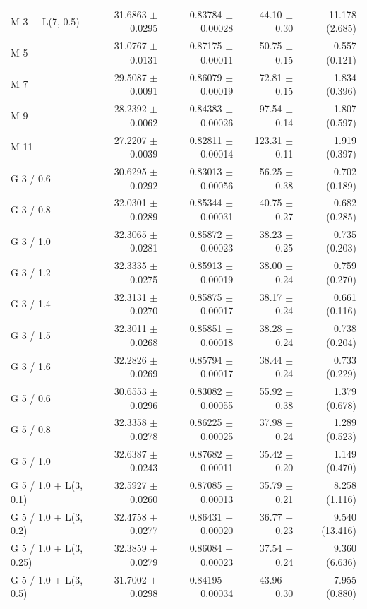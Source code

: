 \begin{longtable}{lrrrr}
M 3 + L(7, 0.5) & 31.6863 $\pm$ 0.0295 & 0.83784 $\pm$ 0.00028 & 44.10 $\pm$ 0.30 & 11.178 (2.685) \\
M 5 & 31.0767 $\pm$ 0.0131 & 0.87175 $\pm$ 0.00011 & 50.75 $\pm$ 0.15 & 0.557 (0.121) \\
M 7 & 29.5087 $\pm$ 0.0091 & 0.86079 $\pm$ 0.00019 & 72.81 $\pm$ 0.15 & 1.834 (0.396) \\
M 9 & 28.2392 $\pm$ 0.0062 & 0.84383 $\pm$ 0.00026 & 97.54 $\pm$ 0.14 & 1.807 (0.597) \\
M 11 & 27.2207 $\pm$ 0.0039 & 0.82811 $\pm$ 0.00014 & 123.31 $\pm$ 0.11 & 1.919 (0.397) \\
G 3 / 0.6 & 30.6295 $\pm$ 0.0292 & 0.83013 $\pm$ 0.00056 & 56.25 $\pm$ 0.38 & 0.702 (0.189) \\
G 3 / 0.8 & 32.0301 $\pm$ 0.0289 & 0.85344 $\pm$ 0.00031 & 40.75 $\pm$ 0.27 & 0.682 (0.285) \\
G 3 / 1.0 & 32.3065 $\pm$ 0.0281 & 0.85872 $\pm$ 0.00023 & 38.23 $\pm$ 0.25 & 0.735 (0.203) \\
G 3 / 1.2 & 32.3335 $\pm$ 0.0275 & 0.85913 $\pm$ 0.00019 & 38.00 $\pm$ 0.24 & 0.759 (0.270) \\
G 3 / 1.4 & 32.3131 $\pm$ 0.0270 & 0.85875 $\pm$ 0.00017 & 38.17 $\pm$ 0.24 & 0.661 (0.116) \\
G 3 / 1.5 & 32.3011 $\pm$ 0.0268 & 0.85851 $\pm$ 0.00018 & 38.28 $\pm$ 0.24 & 0.738 (0.204) \\
G 3 / 1.6 & 32.2826 $\pm$ 0.0269 & 0.85794 $\pm$ 0.00017 & 38.44 $\pm$ 0.24 & 0.733 (0.229) \\
G 5 / 0.6 & 30.6553 $\pm$ 0.0296 & 0.83082 $\pm$ 0.00055 & 55.92 $\pm$ 0.38 & 1.379 (0.678) \\
G 5 / 0.8 & 32.3358 $\pm$ 0.0278 & 0.86225 $\pm$ 0.00025 & 37.98 $\pm$ 0.24 & 1.289 (0.523) \\
G 5 / 1.0 & 32.6387 $\pm$ 0.0243 & 0.87682 $\pm$ 0.00011 & 35.42 $\pm$ 0.20 & 1.149 (0.470) \\
G 5 / 1.0 + L(3, 0.1) & 32.5927 $\pm$ 0.0260 & 0.87085 $\pm$ 0.00013 & 35.79 $\pm$ 0.21 & 8.258 (1.116) \\
G 5 / 1.0 + L(3, 0.2) & 32.4758 $\pm$ 0.0277 & 0.86431 $\pm$ 0.00020 & 36.77 $\pm$ 0.23 & 9.540 (13.416) \\
G 5 / 1.0 + L(3, 0.25) & 32.3859 $\pm$ 0.0279 & 0.86084 $\pm$ 0.00023 & 37.54 $\pm$ 0.24 & 9.360 (6.636) \\
G 5 / 1.0 + L(3, 0.5) & 31.7002 $\pm$ 0.0298 & 0.84195 $\pm$ 0.00034 & 43.96 $\pm$ 0.30 & 7.955 (0.880) \\

\end{longtable}
